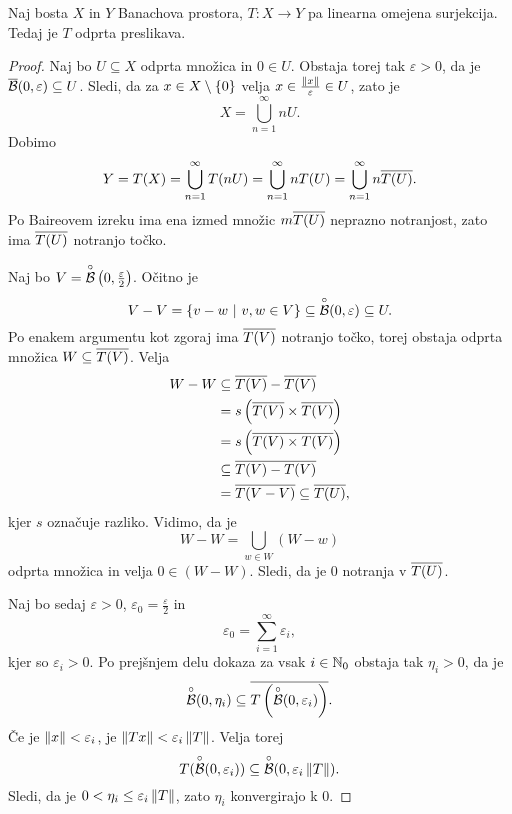 
\begin{izrek}
Naj bosta $X$ in $Y$ Banachova prostora, $T \colon X \to Y$ pa
linearna omejena surjekcija. Tedaj je $T$ odprta preslikava.
\end{izrek}

\begin{proof}
Naj bo $U \subseteq X$ odprta množica in $0 \in U$. Obstaja torej
tak $\varepsilon > 0$, da je
$\overline{\mathcal{B}}(0, \varepsilon) \subseteq U$. Sledi, da za
$x \in X \setminus \left\{0\right\}$ velja
$x \in \frac{\left\lVert x\right\rVert}{\varepsilon} \in U$, zato je
\[
X = \bigcup_{n=1}^\infty nU.
\]
Dobimo
\[
Y = T(X) = \bigcup_{n=1}^\infty T(nU) =
\bigcup_{n=1}^\infty n T(U) = \bigcup_{n=1}^\infty n \overline{T(U)}.
\]
Po Baireovem izreku ima ena izmed množic $m \overline{T(U)}$ neprazno
notranjost, zato ima $\overline{T(U)}$ notranjo točko.

Naj bo $V = \overset{\circ}{\mathcal{B}}\left(0, \frac{\varepsilon}{2}\right)$. Očitno je
\[
V-V = \left\{v-w~\middle\vert~v, w \in V\right\} \subseteq
\overset{\circ}{\mathcal{B}}(0, \varepsilon) \subseteq U.
\]
Po enakem argumentu kot zgoraj ima $\overline{T(V)}$ notranjo točko,
torej obstaja odprta množica $W \subseteq \overline{T(V)}$. Velja
\begin{align*}
W-W &\subseteq \overline{T(V)} - \overline{T(V)}
\\
&= s\left(\overline{T(V)} \times \overline{T(V)}\right)
\\
&= s\left(\overline{T(V) \times T(V)}\right)
\\
&\subseteq \overline{T(V) - T(V)}
\\
&= \overline{T(V-V)} \subseteq \overline{T(U)},
\end{align*}
kjer $s$ označuje razliko. Vidimo, da je
\[
W-W = \bigcup_{w \in W}(W-w)
\]
odprta množica in velja $0 \in (W-W)$. Sledi, da je $0$ notranja v
$\overline{T(U)}$.

Naj bo sedaj $\varepsilon > 0$,
$\varepsilon_0 = \frac{\varepsilon}{2}$ in
\[
\varepsilon_0 = \sum_{i=1}^\infty \varepsilon_i,
\]
kjer so $\varepsilon_i > 0$. Po prejšnjem delu dokaza za vsak
$i \in \mathbb{N}_0$ obstaja tak $\eta_i > 0$, da je
\[
\overset{\circ}{\mathcal{B}}(0, \eta_i) \subseteq \overline{T\left(\overset{\circ}{\mathcal{B}}(0, \varepsilon_i)\right)}.
\]
Če je $\left\lVert x\right\rVert < \varepsilon_i$, je
$\left\lVert Tx\right\rVert < \varepsilon_i \left\lVert T\right\rVert$. Velja torej
\[
T(\overset{\circ}{\mathcal{B}}(0, \varepsilon_i)) \subseteq
\overset{\circ}{\mathcal{B}}(0, \varepsilon_i \left\lVert T\right\rVert).
\]
Sledi, da je $0 < \eta_i \leq \varepsilon_i \left\lVert T\right\rVert$, zato
$\eta_i$ konvergirajo k $0$.


\end{proof}
